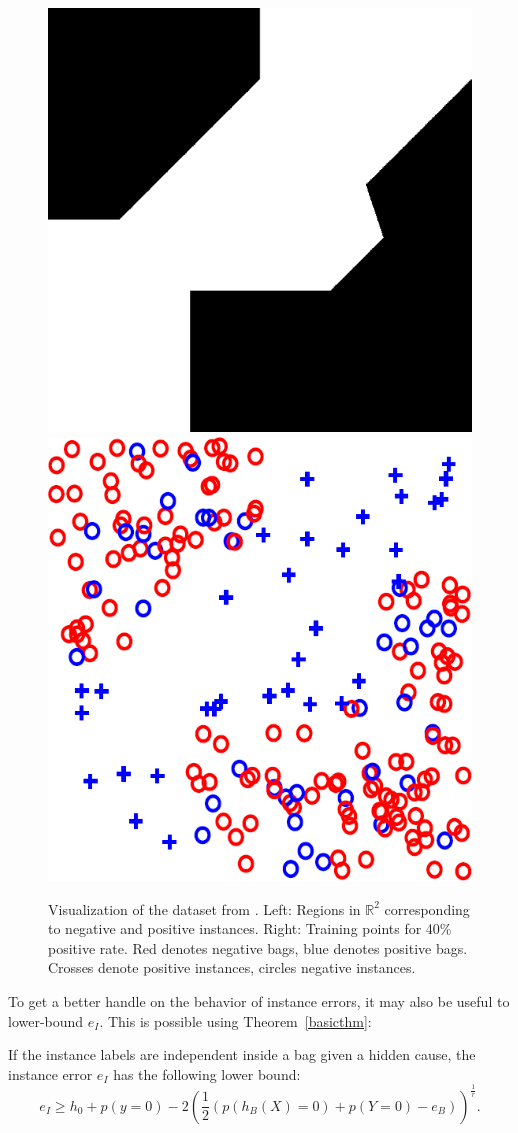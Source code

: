 \begin{figure}[tbp]
	\begin{center}
		\includegraphics[width=.40 \linewidth]{images/gehler_decision_boundary.png}\hspace{35px}
		\includegraphics[width=.40 \linewidth]{images/gehler_instances.png}
	\end{center}
	\caption{Visualization of the dataset from \citet{gehler2007deterministic}. Left: Regions in $\mathbb{R}^2$
    corresponding to negative and positive instances. Right: Training points for 40\% positive rate. Red denotes negative
    bags, blue denotes positive bags. Crosses denote positive instances, circles negative instances.}

\end{figure}
To get a better handle on the behavior of instance errors, it may also be useful to lower-bound $e_I$.
This is possible using Theorem~\ref{basicthm}:

\begin{theorem}\label{lowerbound}
If the instance labels are independent inside a bag given a hidden cause, the instance
error $e_I$ has the following lower bound:
\begin{equation}
e_I \geq h_0 + p(y=0)
- 2 \left (\frac{1}{2} (p(h_B(X)=0) + p(Y=0) - e_B) \right)^\frac{1}{r}.
\end{equation}
\end{theorem}


